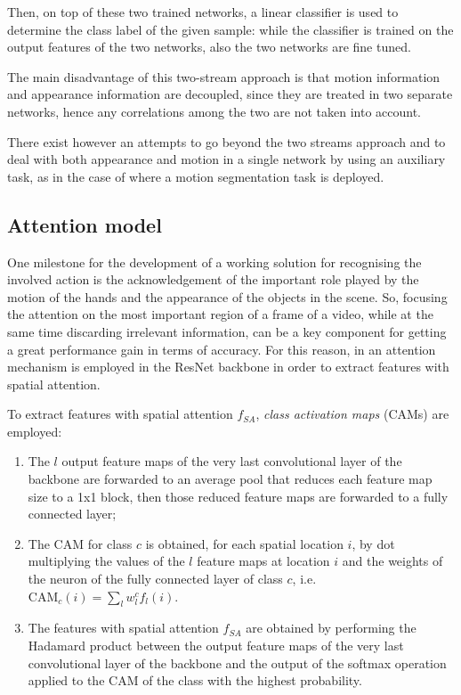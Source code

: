 \documentclass[10pt,twocolumn,letterpaper]{article}
\begin{document}
Then, on top of these two trained networks, a linear classifier is used to determine the class label of the given sample: while the classifier is trained on the output features of the two networks, also the two networks are fine tuned.

The main disadvantage of this two-stream approach is that motion information and appearance information are decoupled, since they are treated in two separate networks, hence any correlations among the two are not taken into account.

There exist however an attempts to go beyond the two streams approach and to deal with both appearance and motion in a single network by using an auxiliary task, as in the case of \cite{planamente2020joint} where a motion segmentation task is deployed.

\subsection{Attention model}
\label{par:AttentionModel}
One milestone for the development of a working solution for recognising the involved action is the acknowledgement of the important role played by the motion of the hands and the appearance of the objects in the scene. So, focusing the attention on the most important region of a frame of a video, while at the same time discarding irrelevant information, can be a key component for getting a great performance gain in terms of accuracy. For this reason, in \cite{Ego-RNN} an attention mechanism is employed in the ResNet backbone in order to extract features with spatial attention.

To extract features with spatial attention $f_{SA}$, \textit{class activation maps} (CAMs) are employed:
\begin{enumerate}
	\item The $l$ output feature maps of the very last convolutional layer of the backbone are forwarded to an average pool that reduces each feature map size to a 1x1 block, then those reduced feature maps are forwarded to a fully connected layer;
	\item The CAM for class $c$ is obtained, for each spatial location $i$, by dot multiplying the values of the $l$ feature maps at location $i$ and the weights of the neuron of the fully connected layer of class $c$, i.e. ${\text{CAM}_c(i) = \sum_l w_l^c f_l(i)}$. 
	\item The features with spatial attention $f_{SA}$ are obtained by performing the Hadamard product between the output feature maps of the very last convolutional layer of the backbone and the output of the softmax operation applied to the CAM of the class with the highest probability.
\end{enumerate}
\end{document}
